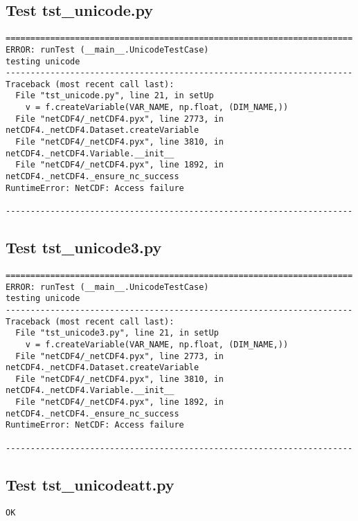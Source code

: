 \subsection{Test tst\_unicode.py}

\begin{verbatim}
======================================================================
ERROR: runTest (__main__.UnicodeTestCase)
testing unicode
----------------------------------------------------------------------
Traceback (most recent call last):
  File "tst_unicode.py", line 21, in setUp
    v = f.createVariable(VAR_NAME, np.float, (DIM_NAME,))
  File "netCDF4/_netCDF4.pyx", line 2773, in netCDF4._netCDF4.Dataset.createVariable
  File "netCDF4/_netCDF4.pyx", line 3810, in netCDF4._netCDF4.Variable.__init__
  File "netCDF4/_netCDF4.pyx", line 1892, in netCDF4._netCDF4._ensure_nc_success
RuntimeError: NetCDF: Access failure

----------------------------------------------------------------------
\end{verbatim}

\subsection{Test tst\_unicode3.py}

\begin{verbatim}
======================================================================
ERROR: runTest (__main__.UnicodeTestCase)
testing unicode
----------------------------------------------------------------------
Traceback (most recent call last):
  File "tst_unicode3.py", line 21, in setUp
    v = f.createVariable(VAR_NAME, np.float, (DIM_NAME,))
  File "netCDF4/_netCDF4.pyx", line 2773, in netCDF4._netCDF4.Dataset.createVariable
  File "netCDF4/_netCDF4.pyx", line 3810, in netCDF4._netCDF4.Variable.__init__
  File "netCDF4/_netCDF4.pyx", line 1892, in netCDF4._netCDF4._ensure_nc_success
RuntimeError: NetCDF: Access failure

----------------------------------------------------------------------
\end{verbatim}

\subsection{Test tst\_unicodeatt.py}

\begin{verbatim}
OK
\end{verbatim}

